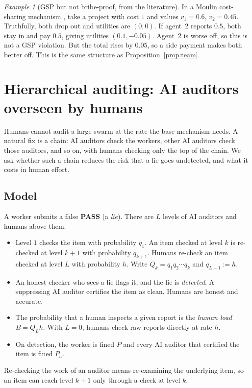 \documentclass[11pt]{article}
\theoremstyle{definition}
\theoremstyle{remark}
\newtheorem{example}[theorem]{Example}
\newcommand{\PASS}{\textbf{PASS}}
\newcommand{\1}{\mathbf{1}}
\begin{document}
\begin{example}[GSP but not bribe-proof, from the literature]
In a Moulin cost-sharing mechanism \cite{moulin2001}, take a project with cost $1$ and
values $v_1=0.6$, $v_2=0.45$. Truthfully, both drop out and utilities are $(0,0)$. If
agent~2 reports $0.5$, both stay in and pay $0.5$, giving utilities $(0.1,-0.05)$.
Agent~2 is worse off, so this is not a GSP violation. But the total rises by $0.05$, so a
side payment makes both better off. This is the same structure as
Proposition~\ref{prop:team}.
\end{example}

\section{Hierarchical auditing: AI auditors overseen by humans}
\label{sec:hierarchy}

Humans cannot audit a large swarm at the rate the base mechanism needs. A natural fix is a
chain: AI auditors check the workers, other AI auditors check those auditors, and so on,
with humans checking only the top of the chain. We ask whether such a chain reduces the
risk that a lie goes undetected, and what it costs in human effort.

\subsection{Model}
A worker submits a false \PASS{} (a \emph{lie}). There are $L$ levels of AI auditors and
humans above them.
\begin{itemize}
    \item Level $1$ checks the item with probability $q_1$. An item checked at level $k$ is
    re-checked at level $k+1$ with probability $q_{k+1}$. Humans re-check an item checked
    at level $L$ with probability $h$. Write $Q_k=q_1q_2\cdots q_k$ and
    $q_{L+1}:=h$.
    \item An honest checker who sees a lie flags it, and the lie is \emph{detected}. A
    suppressing AI auditor certifies the item as clean. Humans are honest and accurate.
    \item The probability that a human inspects a given report is the \emph{human load}
    $B=Q_L h$. With $L=0$, humans check raw reports directly at rate $h$.
    \item On detection, the worker is fined $P$ and every AI auditor that certified the
    item is fined $P_a$.
\end{itemize}
Re-checking the work of an auditor means re-examining the underlying item, so an item can
reach level $k+1$ only through a check at level $k$.
\end{document}
